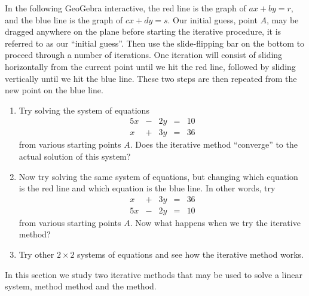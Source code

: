 \documentclass{ximera}
\begin{document}
\begin{exploration}\label{exp:gauss-seidel2x2}
In the following GeoGebra interactive, the red line is the graph of $ax+by=r$, and the blue line is the graph of $cx+dy=s$.  Our initial guess, point $A$, may be dragged anywhere on the plane before starting the iterative procedure, it is referred to as our ``initial guess''.  Then use the slide-flipping bar on the bottom to proceed through a number of iterations.  One iteration will consist of sliding horizontally from the current point until we hit the red line, followed by sliding vertically until we hit the blue line.  These two steps are then repeated from the new point on the blue line.
    
    \begin{enumerate}
        \item Try solving the system of equations
\begin{equation*}\label{eq:diagdom1}
\begin{array}{ccccc}
      5x& -&2y&=&10\\
      x & +&3y&= &36 
    \end{array}
\end{equation*}
from various starting points $A$.  Does the iterative method ``converge'' to the actual solution of this system?
        \item Now try solving the same system of equations, but changing which equation is the red line and which equation is the blue line.  In other words, try
\begin{equation*}\label{eq:diagdom1}
\begin{array}{ccccc}
      x & +&3y&= &36  \\
     5x& -&2y&=&10
    \end{array}
\end{equation*}
from various starting points $A$.  Now what happens when we try the iterative method?
\item Try other $2 \times 2$ systems of equations and see how the iterative method works.
    \end{enumerate}

    \begin{center}
\end{center}
\end{exploration}


In this section we study two iterative methods that may be used to solve a linear system,  method  method and the  method.
\end{document}
